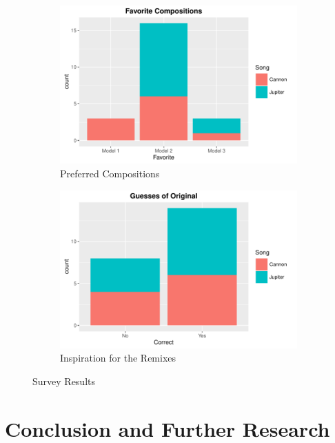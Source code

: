 \documentclass{article} %
\begin{document}
\begin{figure}
\centering
\begin{subfigure}{.5\textwidth}
  \centering
  \includegraphics[scale = 0.5]{SurveyFav.pdf}
  \caption{Preferred Compositions}
  \label{fig:sub1}
\end{subfigure}%
\begin{subfigure}{.5\textwidth}
  \centering
  \includegraphics[scale = 0.5]{SurveyGuesses.pdf}
  \caption{Inspiration for the Remixes}
  \label{fig:sub2}
\end{subfigure}
\caption{Survey Results}
\label{fig:test}
\end{figure}




\section{Conclusion and Further Research}
\end{document}
